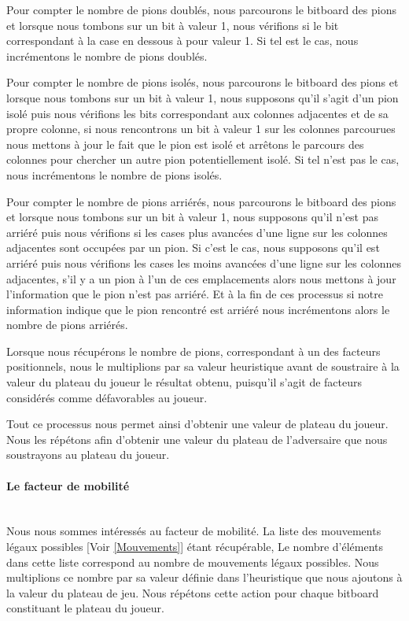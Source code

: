 \documentclass{article}
\begin{document}
Pour compter le nombre de pions doublés, nous parcourons le bitboard des pions et lorsque nous tombons sur un bit à valeur 1, nous vérifions si le bit correspondant à la case en dessous à pour valeur 1.\newline
Si tel est le cas, nous incrémentons le nombre de pions doublés.\newline

Pour compter le nombre de pions isolés, nous parcourons le bitboard des pions et lorsque nous tombons sur un bit à valeur 1, nous supposons qu'il s'agit d'un pion isolé puis nous vérifions les bits correspondant aux colonnes adjacentes et de sa propre colonne, si nous rencontrons un bit à valeur 1 sur les colonnes parcourues nous mettons à jour le fait que le pion est isolé et arrêtons le parcours des colonnes pour chercher un autre pion potentiellement isolé. Si tel n'est pas le cas, nous incrémentons le nombre de pions isolés.\newline

Pour compter le nombre de pions arriérés, nous parcourons le bitboard des pions et lorsque nous tombons sur un bit à valeur 1, nous supposons qu'il n'est pas arriéré puis nous vérifions si les cases plus avancées d'une ligne sur les colonnes adjacentes sont occupées par un pion. Si c'est le cas, nous supposons qu'il est arriéré puis nous vérifions les cases les moins avancées d'une ligne sur les colonnes adjacentes, s'il y a un pion à l'un de ces emplacements alors nous mettons à jour l'information que le pion n'est pas arriéré. Et à la fin de ces processus si notre information indique que le pion rencontré est arriéré nous incrémentons alors le nombre de pions arriérés.

Lorsque nous récupérons le nombre de pions, correspondant à un des facteurs positionnels, nous le multiplions par sa valeur heuristique avant de soustraire à la valeur du plateau du joueur le résultat obtenu, puisqu'il s'agit de facteurs considérés comme défavorables au joueur.
\newline

Tout ce processus nous permet ainsi d'obtenir une valeur de plateau du joueur. Nous les répétons afin d'obtenir une valeur du plateau de l'adversaire que nous soustrayons au plateau du joueur.

\paragraph{Le facteur de mobilité}
~~\\
\newline
Nous nous sommes intéressés au facteur de mobilité.\newline
La liste des mouvements légaux possibles [Voir \ref{Mouvements}] étant récupérable,
Le nombre d'éléments dans cette liste correspond au nombre de mouvements légaux possibles.
Nous multiplions ce nombre par sa valeur définie dans l'heuristique que nous ajoutons à la valeur du plateau de jeu.\newline
Nous répétons cette action pour chaque bitboard constituant le plateau du joueur.
\end{document}
